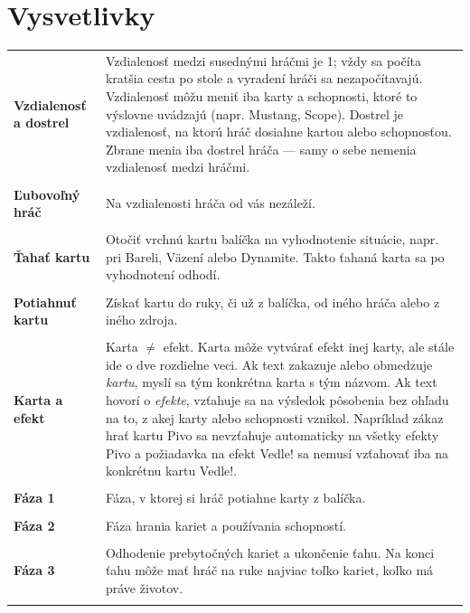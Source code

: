 \chapter*{Vysvetlivky}

\begin{tabular}{>{\raggedright\arraybackslash}p{4cm} >{\raggedleft\arraybackslash}p{10cm}}
    \textbf{Vzdialenosť a dostrel} & Vzdialenosť medzi susednými hráčmi je 1; vždy sa počíta kratšia cesta po stole a vyradení hráči sa nezapočítavajú. Vzdialenosť môžu meniť iba karty a schopnosti, ktoré to výslovne uvádzajú (napr. Mustang, Scope). Dostrel je vzdialenosť, na ktorú hráč dosiahne kartou alebo schopnosťou. Zbrane menia iba dostrel hráča — samy o sebe nemenia vzdialenosť medzi hráčmi. \\\\

    \textbf{Ľubovoľný hráč} & Na vzdialenosti hráča od vás nezáleží. \\\\

    \textbf{Ťahať kartu} & Otočiť vrchnú kartu balíčka na vyhodnotenie situácie, napr. pri Bareli, Väzení alebo Dynamite. Takto ťahaná karta sa po vyhodnotení odhodí. \\\\

    \textbf{Potiahnuť kartu} & Získať kartu do ruky, či už z balíčka, od iného hráča alebo z iného zdroja. \\\\

    \textbf{Karta a efekt} & Karta $\neq$ efekt. Karta môže vytvárať efekt inej karty, ale stále ide o dve rozdielne veci. Ak text zakazuje alebo obmedzuje \emph{kartu}, myslí sa tým konkrétna karta s tým názvom. Ak text hovorí o \emph{efekte}, vzťahuje sa na výsledok pôsobenia bez ohľadu na to, z akej karty alebo schopnosti vznikol. Napríklad zákaz hrať kartu Pivo sa nevzťahuje automaticky na všetky efekty Pivo a požiadavka na efekt Vedle! sa nemusí vzťahovať iba na konkrétnu kartu Vedle!. \\\\

    \textbf{Fáza 1} & Fáza, v ktorej si hráč potiahne karty z balíčka.\\\\
    \textbf{Fáza 2} & Fáza hrania kariet a používania schopností. \\\\
    \textbf{Fáza 3} & Odhodenie prebytočných kariet a ukončenie ťahu. Na konci ťahu môže mať hráč na ruke najviac toľko kariet, koľko má práve životov. \\\\
\end{tabular}
